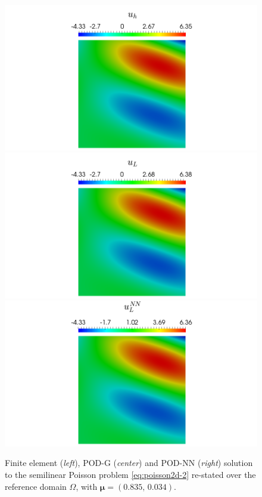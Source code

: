 \documentclass[12pt, a4paper, twoside, openright, notitlepage]{report}
\numberwithin{equation}{chapter}
\theoremstyle{theorem}
\theoremstyle{definition}
\theoremstyle{remark}
\theoremstyle{proposition}
\numberwithin{figure}{chapter}
\newcommand{\bg}[1]{\boldsymbol{#1}}
\begin{document}
		\begin{figure}[H]
			\center
			\includegraphics[scale = 0.29, trim = {8.5cm 0 8.5cm 0}, clip]{poisson2d_2_fe_solution}
			\includegraphics[scale = 0.29, trim = {8.5cm 0 8.5cm 0}, clip]{poisson2d_2_podg_solution}
			\includegraphics[scale = 0.29, trim = {8.5cm 0 8.5cm 0}, clip]{poisson2d_2_podnn_solution}
		
			\caption{Finite element (\emph{left}), POD-G (\emph{center}) and POD-NN (\emph{right}) solution to the semilinear Poisson problem \eqref{eq:poisson2d-2} re-stated over the reference domain $\Omega$, with $\bg{\mu} = (0.835, \, 0.034)$.}
			\label{fig:poisson2d-2-fig1}
				

\end{figure}
\end{document}
